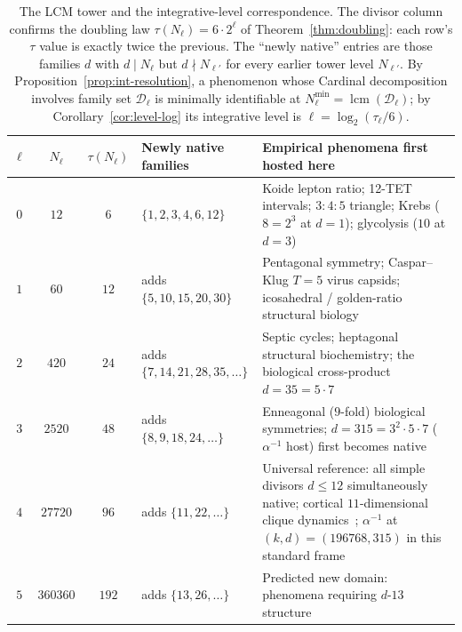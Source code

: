 \documentclass[11pt,a4paper]{article}
\theoremstyle{definition}
\theoremstyle{remark}
\DeclareMathOperator{\lcm}{lcm}
\begin{document}
\begin{table}[h]
\centering
\begin{tabularx}{\textwidth}{@{}c c c l X@{}}
\toprule
$\ell$ & $N_{\ell}$ & $\tau(N_{\ell})$ & Newly native families & Empirical phenomena first hosted here\\
\midrule
$0$ & $12$ & $6$ & $\{1,2,3,4,6,12\}$ & Koide lepton ratio; 12-TET intervals; $3{:}4{:}5$ triangle; Krebs ($8{=}2^{3}$ at $d{=}1$); glycolysis ($10$ at $d{=}3$)\\
\addlinespace
$1$ & $60$ & $12$ & adds $\{5,10,15,20,30\}$ & Pentagonal symmetry; Caspar--Klug $T{=}5$ virus capsids; icosahedral / golden-ratio structural biology\\
\addlinespace
$2$ & $420$ & $24$ & adds $\{7,14,21,28,35,\ldots\}$ & Septic cycles; heptagonal structural biochemistry; the biological cross-product $d{=}35{=}5\cdot 7$\\
\addlinespace
$3$ & $2520$ & $48$ & adds $\{8,9,18,24,\ldots\}$ & Enneagonal ($9$-fold) biological symmetries; $d{=}315{=}3^{2}\cdot 5\cdot 7$ ($\alpha^{-1}$ host) first becomes native\\
\addlinespace
$4$ & $27720$ & $96$ & adds $\{11,22,\ldots\}$ & Universal reference: all simple divisors $d\le 12$ simultaneously native; cortical $11$-dimensional clique dynamics~\cite{BlueBrain2017}; $\alpha^{-1}$ at $(k,d)=(196768,315)$ in this standard frame\\
\addlinespace
$5$ & $360360$ & $192$ & adds $\{13,26,\ldots\}$ & Predicted new domain: phenomena requiring $d$-$13$ structure\\
\bottomrule
\end{tabularx}
\caption{The LCM tower and the integrative-level correspondence. The divisor column confirms the doubling law $\tau(N_{\ell}) = 6\cdot 2^{\ell}$ of Theorem~\ref{thm:doubling}: each row's $\tau$ value is exactly twice the previous. The ``newly native'' entries are those families $d$ with $d\mid N_{\ell}$ but $d\nmid N_{\ell'}$ for every earlier tower level $N_{\ell'}$. By Proposition~\ref{prop:int-resolution}, a phenomenon whose Cardinal decomposition involves family set $\mathcal{D}_{\ell}$ is minimally identifiable at $N_{\ell}^{\min}=\lcm(\mathcal{D}_{\ell})$; by Corollary~\ref{cor:level-log} its integrative level is $\ell = \log_{2}(\tau_{\ell}/6)$.}
\label{tab:int-resolution}
\end{table}
\end{document}

